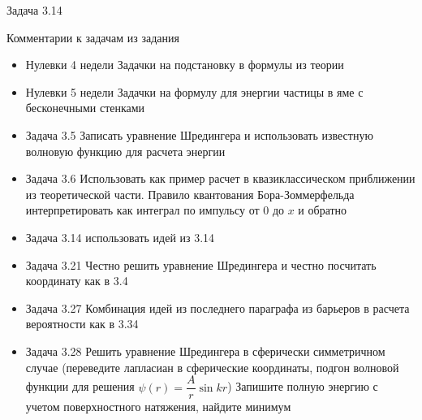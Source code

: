 \documentclass[12]{beamer}
\begin{document}
\begin{frame}{Задача 3.14}\scriptsize
{}
\end{frame}




\begin{frame}[t]{Комментарии к задачам из задания}\scriptsize
\begin{itemize}
\item{Нулевки 4 недели} Задачки на подстановку в формулы из теории
\item{Нулевки 5 недели} Задачки на формулу для энергии частицы в яме с бесконечными стенками
\item{Задача 3.5} Записать уравнение Шредингера и использовать известную волновую функцию для расчета энергии
\item{Задача 3.6} Использовать как пример расчет в квазиклассическом приближении из теоретической части. Правило квантования Бора-Зоммерфельда интерпретировать как интеграл по импульсу от 0 до $x$ и обратно
\item{Задача 3.14} использовать идей из 3.14
\item{Задача 3.21} Честно решить уравнение Шредингера и честно посчитать координату как в 3.4
\item{Задача 3.27} Комбинация идей из последнего параграфа из барьеров в расчета вероятности как в 3.34
\item{Задача 3.28} Решить уравнение Шредингера в сферически симметричном случае (переведите лапласиан в сферические координаты, подгон волновой функции для решения $\psi(r) = \dfrac{A}{r}\sin{kr}$) Запишите полную энергию с учетом поверхностного натяжения, найдите минимум

\end{itemize}
\end{frame}
\end{document}
